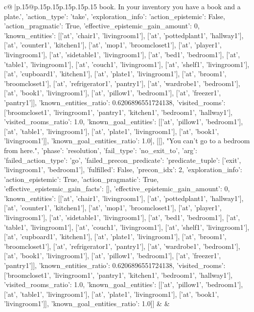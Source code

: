\documentclass{article}
\begin{document}
{\begin{supertabular}{c@{$\;$}|p{.15\linewidth}@{}p{.15\linewidth}p{.15\linewidth}p{.15\linewidth}p{.15\linewidth}p{.15\linewidth}}
{{{book. In your inventory you have a book and a plate.', {'action_type': 'take', 'exploration_info': {'action_epistemic': False, 'action_pragmatic': True, 'effective_epistemic_gain_amount': 0, 'known_entities': [['at', 'chair1', 'livingroom1'], ['at', 'pottedplant1', 'hallway1'], ['at', 'counter1', 'kitchen1'], ['at', 'mop1', 'broomcloset1'], ['at', 'player1', 'livingroom1'], ['at', 'sidetable1', 'livingroom1'], ['at', 'bed1', 'bedroom1'], ['at', 'table1', 'livingroom1'], ['at', 'couch1', 'livingroom1'], ['at', 'shelf1', 'livingroom1'], ['at', 'cupboard1', 'kitchen1'], ['at', 'plate1', 'livingroom1'], ['at', 'broom1', 'broomcloset1'], ['at', 'refrigerator1', 'pantry1'], ['at', 'wardrobe1', 'bedroom1'], ['at', 'book1', 'livingroom1'], ['at', 'pillow1', 'bedroom1'], ['at', 'freezer1', 'pantry1']], 'known_entities_ratio': 0.6206896551724138, 'visited_rooms': ['broomcloset1', 'livingroom1', 'pantry1', 'kitchen1', 'bedroom1', 'hallway1'], 'visited_rooms_ratio': 1.0, 'known_goal_entities': [['at', 'pillow1', 'bedroom1'], ['at', 'table1', 'livingroom1'], ['at', 'plate1', 'livingroom1'], ['at', 'book1', 'livingroom1']], 'known_goal_entities_ratio': 1.0}}], [[], "You can't go to a bedroom from here.", {'phase': 'resolution', 'fail_type': 'no_exit_to', 'arg': {'failed_action_type': 'go', 'failed_precon_predicate': {'predicate_tuple': ['exit', 'livingroom1', 'bedroom1'], 'fulfilled': False, 'precon_idx': 2}}, 'exploration_info': {'action_epistemic': True, 'action_pragmatic': True, 'effective_epistemic_gain_facts': [], 'effective_epistemic_gain_amount': 0, 'known_entities': [['at', 'chair1', 'livingroom1'], ['at', 'pottedplant1', 'hallway1'], ['at', 'counter1', 'kitchen1'], ['at', 'mop1', 'broomcloset1'], ['at', 'player1', 'livingroom1'], ['at', 'sidetable1', 'livingroom1'], ['at', 'bed1', 'bedroom1'], ['at', 'table1', 'livingroom1'], ['at', 'couch1', 'livingroom1'], ['at', 'shelf1', 'livingroom1'], ['at', 'cupboard1', 'kitchen1'], ['at', 'plate1', 'livingroom1'], ['at', 'broom1', 'broomcloset1'], ['at', 'refrigerator1', 'pantry1'], ['at', 'wardrobe1', 'bedroom1'], ['at', 'book1', 'livingroom1'], ['at', 'pillow1', 'bedroom1'], ['at', 'freezer1', 'pantry1']], 'known_entities_ratio': 0.6206896551724138, 'visited_rooms': ['broomcloset1', 'livingroom1', 'pantry1', 'kitchen1', 'bedroom1', 'hallway1'], 'visited_rooms_ratio': 1.0, 'known_goal_entities': [['at', 'pillow1', 'bedroom1'], ['at', 'table1', 'livingroom1'], ['at', 'plate1', 'livingroom1'], ['at', 'book1', 'livingroom1']], 'known_goal_entities_ratio': 1.0}}]] 
	  } 
	   } 
	   } 
	 & & \\ 
 


\end{supertabular}}
\end{document}
